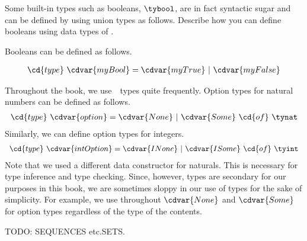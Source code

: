 \begin{flex}
\label{grp:xrcs:sparc::booleans}

\begin{exercise}[Booleans]
\label{xrcs:sparc::booleans}
Some built-in types such as booleans, $\tybool$, are in fact syntactic
sugar and can be defined by using union types as follows.
Describe how you can define booleans using data types of \pml{}.

\end{exercise}

\begin{solution}
\label{sol:sparc::booleans}
Booleans can be defined as follows.

\[
\begin{array}{l}
\cd{type}~\cdvar{myBool} = \cdvar{myTrue}~|~\cdvar{myFalse} 
\end{array}
\] 

\end{solution}
\end{flex}

\begin{cluster}
\label{grp:grm:sparc::option-type}

\begin{gram}
\label{grm:sparc::option-type}
Throughout the book, we use~~types quite frequently.
Option types for natural numbers can be defined as follows.
\[
\begin{array}{l}
\cd{type}~\cdvar{option} = \cdvar{None} ~|~ \cdvar{Some}~\cd{of}~\tynat
\end{array}
\]
Similarly, we can define option types for integers.
\[
\begin{array}{l}
\cd{type}~\cdvar{intOption} = \cdvar{INone} ~|~ \cdvar{ISome}~\cd{of}~\tyint
\end{array}
\]
Note that we used a different data constructor for naturals.  
This is necessary for type inference and type checking.
Since, however, types are secondary for our purposes in this book, we
are sometimes sloppy in our use of types for the sake of simplicity.
For example, we use throughout $\cdvar{None}$ and $\cdvar{Some}$ for option
types regardless of the type of the contents.

\end{gram}
\end{cluster}

\begin{cluster}
\label{grp:tch:sparc::todo}

\begin{teachnote}
\label{tch:sparc::todo}
TODO: SEQUENCES etc.SETS.

\end{teachnote}
\end{cluster}


